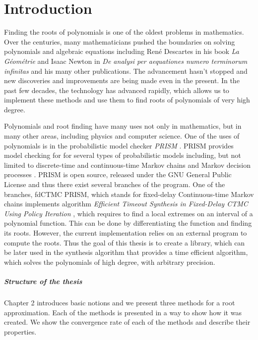 \documentclass[
  digital, %
  notable,   %
  nolof,     %
  nolot,     %
	final, %
]{fithesis3}
\begin{document}
\newtheorem{theorem}{Theorem}[section] %
\newtheorem{corollary}[theorem]{Corollary}
\chapter{Introduction}
Finding the roots of polynomials is one of the oldest problems in mathematics. Over the centuries, many mathematicians pushed the boundaries on solving polynomials and algebraic equations including Ren{\'e} Descartes in his book \emph{La G{\'e}om{\'e}trie} and Isaac Newton in \emph{De analysi per aequationes numero terminorum infinitas} and his many other publications. The advancement hasn't stopped and new discoveries and improvements are being made even in the present. In the past few decades, the technology has advanced rapidly, which allows us to implement these methods and use them to find roots of polynomials of very high degree. 

Polynomials and root finding have many uses not only in mathematics, but in many other areas, including physics and computer science. One of the uses of polynomials is in the probabilistic model checker \emph{PRISM} \parencite{KNP11}. PRISM provides model checking for for several types of probabilistic models including, but not limited to discrete-time and continuous-time Markov chains and Markov decision processes \parencite{KNP11}. PRISM is open source, released under the GNU General Public License and thus there exist several branches of the program. One of the branches, fdCTMC PRISM, which stands for fixed-delay Continuous-time Markov chains implements algorithm \emph{Efficient Timeout Synthesis in Fixed-Delay CTMC Using Policy Iteration} \parencite{DBLP:conf/mascots/KorenciakKR16}, which requires to find a local extremes on an interval of a polynomial function. This can be done by differentiating the function and finding its roots. However, the current implementation relies on an external program to compute the roots. Thus the goal of this thesis is to create a library, which can be later used in the synthesis algorithm that provides a time efficient algorithm, which solves the polynomials of high degree, with arbitrary precision.

\paragraph{Structure of the thesis}
Chapter 2 introduces basic notions and we present three methods for a root approximation. Each of the methods is presented in a way to show how it was created. We show the convergence rate of each of the methods and describe their properties.
\end{document}
